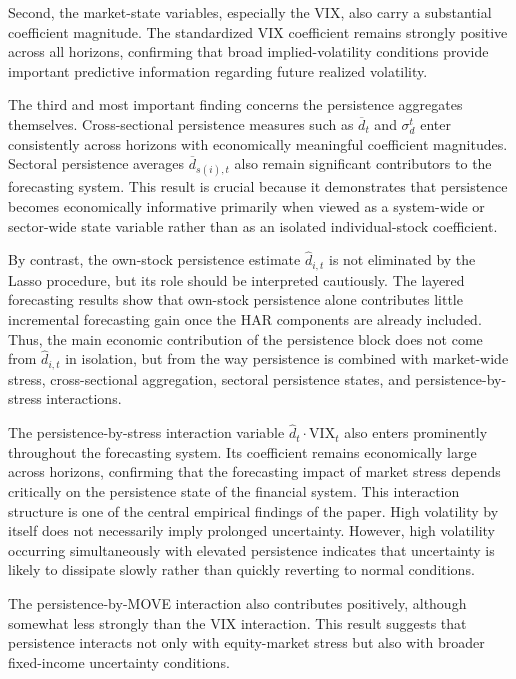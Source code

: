 \documentclass[unnumsec,webpdf,contemporary,large]{oup-authoring-template}%
\theoremstyle{thmstyleone}%
\theoremstyle{thmstyletwo}%
\theoremstyle{thmstylethree}%
\begin{document}
Second, the market-state variables, especially the VIX, also carry
a substantial coefficient magnitude. The standardized VIX coefficient remains
strongly positive across all horizons, confirming that broad
implied-volatility conditions provide important predictive information
regarding future realized volatility.

The third and most important finding concerns the persistence aggregates
themselves. Cross-sectional persistence measures such as $\overline d_t$
and $\sigma_d^t$ enter consistently across horizons with economically
meaningful coefficient magnitudes. Sectoral persistence averages
$\overline d_{s(i),t}$ also remain significant contributors to the
forecasting system. This result is crucial because it demonstrates that
persistence becomes economically informative primarily when viewed as a
system-wide or sector-wide state variable rather than as an isolated
individual-stock coefficient.

By contrast, the own-stock persistence estimate \(\widehat d_{i,t}\) is not eliminated by the 
Lasso procedure, but its role should be interpreted cautiously. The layered forecasting results 
show that own-stock persistence alone contributes little incremental forecasting gain once the 
HAR components are already included. Thus, the main economic contribution of the persistence 
block does not come from \(\widehat d_{i,t}\) in isolation, but from the way persistence is combined 
with market-wide stress, cross-sectional aggregation, sectoral persistence states, and 
persistence-by-stress interactions.

The persistence-by-stress interaction variable $ \hat{d}_t\!\cdot\!\text{VIX}_t$
also enters prominently throughout the forecasting system. Its coefficient
remains economically large across horizons, confirming that the forecasting
impact of market stress depends critically on the persistence state of the
financial system. This interaction structure is one of the central empirical
findings of the paper. High volatility by itself does not necessarily imply
prolonged uncertainty. However, high volatility occurring simultaneously
with elevated persistence indicates that uncertainty is likely to dissipate
slowly rather than quickly reverting to normal conditions.

The persistence-by-MOVE interaction also contributes positively, although
somewhat less strongly than the VIX interaction. This result suggests that
persistence interacts not only with equity-market stress but also with
broader fixed-income uncertainty conditions.
\end{document}
